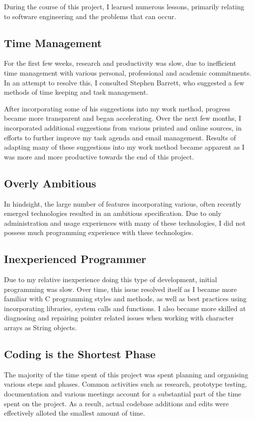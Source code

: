 
During the course of this project, I learned numerous lessons, primarily
relating to software engineering and the problems that can occur.

\subsection{Time Management}

For the first few weeks, research and productivity was slow, due to
inefficient time management with various personal, professional and
academic commitments. In an attempt to resolve this, I consulted
Stephen Barrett, who suggested a few methods of time keeping and task
management.


After incorporating some of his suggestions into my work method,
progress became more transparent and began accelerating. Over the next
few months, I incorporated additional suggestions from various printed
and online sources, in efforts to further improve my task agenda and 
email management. Results of adapting many of these suggestions into my
work method became apparent as I was more and more productive towards
the end of this project.

\subsection{Overly Ambitious}

In hindsight, the large number of features incorporating various, often
recently emerged technologies resulted in an ambitious specification.
Due to only administration and usage experiences with many of these
technologies, I did not possess much  programming experience with these
technologies. 

\subsection{Inexperienced Programmer}

Due to my relative inexperience doing this type of development, initial
programming was slow. Over time, this issue resolved itself as I became
more familiar with C programming styles and methods, as well as best
practices using incorporating libraries, system calls and functions. I
also became more skilled at diagnosing and repairing pointer related 
issues when working with character arrays as String objects.

\subsection{Coding is the Shortest Phase}

The majority of the time spent of this project was spent planning and
organising various steps and phases. Common activities such as research,
prototype testing, documentation and various meetings account for a 
substantial part of the time spent on the project. As a result, actual 
codebase additions and edits were effectively alloted the smallest 
amount of time.

